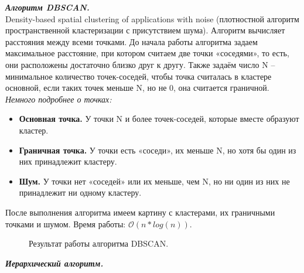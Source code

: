 \documentclass[12pt, a4paper]{article}
\begin{document}
\textit{\textbf{Алгоритм DBSCAN.}}\\Density-based spatial clustering of applications with noise (плотностной алгоритм пространственной кластеризации с присутствием шума). Алгоритм вычисляет расстояния между всеми точками. До начала работы алгоритма задаем максимальное расстояние, при котором считаем две точки «соседями», то есть, они расположены достаточно близко друг к другу. Также задаём число N -- минимальное количество точек-соседей, чтобы точка считалась в кластере основной, если таких точек меньше N, но не 0, она считается граничной. \\\textit{Немного подробнее о точках:}
\begin{itemize}
\item\textbf{Основная точка.} У точки N и более точек-соседей, которые вместе образуют кластер.
\item\textbf{Граничная точка.} У точки есть «соседи», их меньше N, но хотя бы один из них принадлежит кластеру.
\item\textbf{Шум.} У точки нет «соседей» или их меньше, чем N, но ни один из них не принадлежит ни одному кластеру.
\end{itemize}
После выполнения алгоритма имеем картину с кластерами, их граничными точками и шумом. Время работы: $\mathcal{O}(n*log(n)).$
\begin{figure}[h!]
\caption{Результат работы алгоритма DBSCAN.}
\label{fig:dbscan}
\end{figure}
\medskip 
 \medskip 
  \medskip 
   \medskip 
   
\textit{\textbf{Иерархический алгоритм.}}
\end{document}
